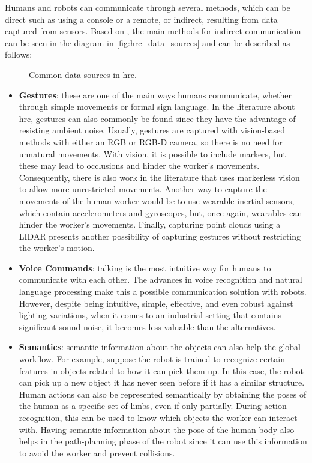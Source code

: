 Humans and robots can communicate through several methods, which can be direct such as using a console or a remote, or indirect, resulting from data captured from sensors. Based on \cite{Castro2021, Mukherjee2022, Semeraro2023}, the main methods for indirect communication can be seen in the diagram in \autoref{fig:hrc_data_sources} and can be described as follows:
\begin{figure}[ht]
    \centering
     
    \caption{Common data sources in \acl{hrc}.}
    \label{fig:hrc_data_sources}
\end{figure}
\begin{itemize}
\item \textbf{Gestures}: these are one of the main ways humans communicate, whether through simple movements or formal sign language. In the literature about \acs{hrc}, gestures can also commonly be found since they have the advantage of resisting ambient noise. Usually, gestures are captured with vision-based methods with either an RGB or RGB-D camera, so there is no need for unnatural movements. With vision, it is possible to include markers, but these may lead to occlusions and hinder the worker's movements. Consequently, there is also work in the literature that uses markerless vision to allow more unrestricted movements. Another way to capture the movements of the human worker would be to use wearable inertial sensors, which contain accelerometers and gyroscopes, but, once again, wearables can hinder the worker's movements. Finally, capturing point clouds using a LIDAR presents another possibility of capturing gestures without restricting the worker's motion.


\item \textbf{Voice Commands}: talking is the most intuitive way for humans to communicate with each other. The advances in voice recognition and natural language processing make this a possible communication solution with robots. However, despite being intuitive, simple, effective, and even robust against lighting variations, when it comes to an industrial setting that contains significant sound noise, it becomes less valuable than the alternatives.

\item \textbf{Semantics}: semantic information about the objects can also help the global workflow. For example, suppose the robot is trained to recognize certain features in objects related to how it can pick them up. In this case, the robot can pick up a new object it has never seen before if it has a similar structure. Human actions can also be represented semantically by obtaining the poses of the human as a specific set of limbs, even if only partially. During action recognition, this can be used to know which objects the worker can interact with. Having semantic information about the pose of the human body also helps in the path-planning phase of the robot since it can use this information to avoid the worker and prevent collisions.


\end{itemize}
